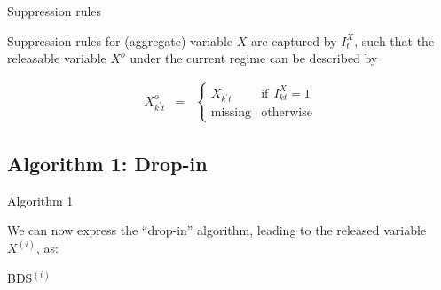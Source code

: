 \begin{frame}{Suppression rules }
\begin{block}{Suppression rules}
for (aggregate) variable $X$ are captured by $I_{t}^X$, such that the 
releasable variable $X^o$  under the current regime can be described by

\begin{eqnarray}
\label{eq:supp_x}
X_{k^\prime t}^o &=& \left \lbrace 
\begin{array}{rl}
X_{k^\prime t} &\mbox{if}~~  I_{kt}^X = 1 \\
\mbox{missing} &\mbox{otherwise}
\end{array} \right .
\end{eqnarray}
\end{block}
\end{frame}



\subsection{Algorithm 1: Drop-in}
\begin{frame}[fragile]{Algorithm 1}

We can now express the ``drop-in'' algorithm, leading to the released variable $X^{(i)}$, as:
\begin{block}{BDS$^{(i)}$}
\begin{algorithm}
\begin{algorithmic}
\Else
\EndIf
\end{algorithmic}
\end{algorithm}
\end{block}
\end{frame}

%

